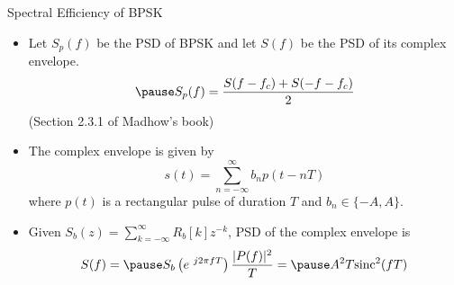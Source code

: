 \documentclass[t]{beamer}
\begin{document}
\begin{frame}{Spectral Efficiency of BPSK}
  \footnotesize
  \begin{itemize}
    \item \pause Let $S_p(f)$ be the PSD of BPSK and let $S(f)$ be the PSD of its complex envelope.
      \begin{equation*}
        \pause S_p(f) = \frac{S(f-f_c) + S(-f-f_c)}{2} 
      \end{equation*}
      \pause (Section 2.3.1 of Madhow's book)
    \item \pause The complex envelope is given by
      \begin{equation*}
        s(t) = \sum_{n=-\infty}^{\infty} b_n p(t-nT)
      \end{equation*}
      where $p(t)$ is a rectangular pulse of duration $T$ and $b_n \in \{-A, A\}$. 
    \item \pause Given $S_b(z) = \sum_{k=-\infty}^{\infty} R_b[k]z^{-k}$, PSD of the complex envelope is
      \begin{eqnarray*}
        S(f) = \pause S_b\left(e^{\ j2\pi fT}\right)\frac{\lvert P(f)\rvert^2}{T} = \pause A^2T\text{sinc}^2(fT) 
      \end{eqnarray*}
  \end{itemize}
  \normalsize
\end{frame}
\end{document}
